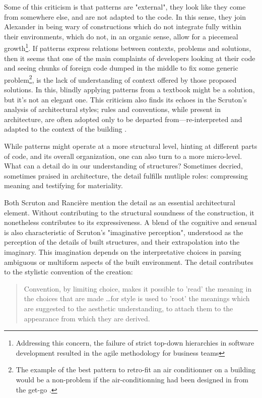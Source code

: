 Some of this criticism is that patterns are "external", they look like they come from somewhere else, and are not adapted to the code. In this sense, they join Alexander in being wary of constructions which do not integrate fully within their environments, which do not, in an organic sense, allow for a piecemeal growth\footnote{Addressing this concern, the failure of strict top-down hierarchies in software development resulted in the agile methodology for business teams}. If patterns express relations between contexts, problems and solutions, then it seems that one of the main complaints of developers looking at their code and seeing chunks of foreign code dumped in the middle to fix some generic problem\footnote{The example of the best pattern to retro-fit an air conditionner on a building would be a non-problem if the air-conditionning had been designed in from the get-go \citep{coplien_patterns_2009}.}, is the lack of understanding of context offered by those proposed solutions. In this, blindly applying patterns from a textbook might be a solution, but it's not an elegant one. This criticism also finds its echoes in the Scruton's analysis of architectural styles; rules and conventions, while present in architecture, are often adopted only to be departed from—re-interpreted and adapted to the context of the building \citep{scruton_aesthetics_2013}.

While patterns might operate at a more structural level, hinting at different parts of code, and its overall organization, one can also turn to a more micro-level. What can a detail do in our understanding of structures? Sometimes decried, sometimes praised in architecture, the detail fulfills mutliple roles: compressing meaning and testifying for materiality.

Both Scruton and Rancière mention the detail as an essential architectural element. Without contributing to the structural soundness of the construction, it nonetheless contributes to its expressiveness. A blend of the cognitive and sensual is also characteristic of Scruton's "imaginative perception", understood as the perception of the details of built structures, and their extrapolation into the imaginary. This imagination depends on the interpretative choices in parsing ambiguous or multiform aspects of the built environment. The detail contributes to the stylistic convention of the creation:

\begin{quote}
    Convention, by limiting choice, makes it possible to 'read' the meaning in the choices that are made \dots for style is used to 'root' the meanings which are suggested to the aesthetic understanding, to attach them to the appearance from which they are derived. \citep{scruton_aesthetics_2013}
\end{quote}

